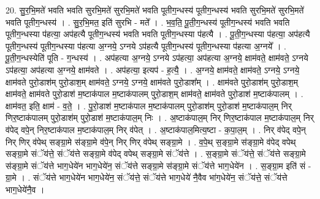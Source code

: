 \documentclass[17pt]{extarticle}
\begin{document}
20. सु॒र॒भि॒मते॑ भवति भवति सुरभि॒मते॑ सुरभि॒मते॑ भवति पूतीग॒न्धस्य॑ पूतीग॒न्धस्य॑ भवति सुरभि॒मते॑ सुरभि॒मते॑ भवति पूतीग॒न्धस्य॑ । . सु॒र॒भि॒मत॒ इति॑ सुरभि - मते᳚ । . भ॒व॒ति॒ पू॒ती॒ग॒न्धस्य॑ पूतीग॒न्धस्य॑ भवति भवति पूतीग॒न्धस्या प॑हत्या॒ अप॑हत्यै पूतीग॒न्धस्य॑ भवति भवति पूतीग॒न्धस्या प॑हत्यै । . पू॒ती॒ग॒न्धस्या प॑हत्या॒ अप॑हत्यै पूतीग॒न्धस्य॑ पूतीग॒न्धस्या प॑हत्या अ॒ग्नये॒ ऽग्नये ऽप॑हत्यै पूतीग॒न्धस्य॑ पूतीग॒न्धस्या प॑हत्या अ॒ग्नये᳚ । . पू॒ती॒ग॒न्धस्येति॑ पूति - ग॒न्धस्य॑ । . अप॑हत्या अ॒ग्नये॒ ऽग्नये ऽप॑हत्या॒ अप॑हत्या अ॒ग्नये॒ क्षाम॑वते॒ क्षाम॑वते॒ ऽग्नये ऽप॑हत्या॒ अप॑हत्या अ॒ग्नये॒ क्षाम॑वते । . अप॑हत्या॒ इत्यप॑ - ह॒त्यै॒ । . अ॒ग्नये॒ क्षाम॑वते॒ क्षाम॑वते॒ ऽग्नये॒ ऽग्नये॒ क्षाम॑वते पुरो॒डाश॑म् पुरो॒डाश॒म् क्षाम॑वते॒ ऽग्नये॒ ऽग्नये॒ क्षाम॑वते पुरो॒डाश᳚म् । . क्षाम॑वते पुरो॒डाश॑म् पुरो॒डाश॒म् क्षाम॑वते॒ क्षाम॑वते पुरो॒डाश॑ म॒ष्टाक॑पाल म॒ष्टाक॑पालम् पुरो॒डाश॒म् क्षाम॑वते॒ क्षाम॑वते पुरो॒डाश॑ म॒ष्टाक॑पालम् । . क्षाम॑वत॒ इति॒ क्षाम॑ - व॒ते॒ । . पु॒रो॒डाश॑ म॒ष्टाक॑पाल म॒ष्टाक॑पालम् पुरो॒डाश॑म् पुरो॒डाश॑ म॒ष्टाक॑पाल॒म् निर् णिर॒ष्टाक॑पालम् पुरो॒डाश॑म् पुरो॒डाश॑ म॒ष्टाक॑पाल॒म् निः । . अ॒ष्टाक॑पाल॒म् निर् णिर॒ष्टाक॑पाल म॒ष्टाक॑पाल॒म् निर् व॑पेद् वपे॒न् निर॒ष्टाक॑पाल म॒ष्टाक॑पाल॒म् निर् व॑पेत् । . अ॒ष्टाक॑पाल॒मित्य॒ष्टा - क॒पा॒ल॒म् । . निर् व॑पेद् वपे॒न् निर् णिर् व॑पेथ् सङ्ग्रा॒मे स॑ङ्ग्रा॒मे व॑पे॒न् निर् णिर् व॑पेथ् सङ्ग्रा॒मे । . व॒पे॒थ् स॒ङ्ग्रा॒मे स॑ङ्ग्रा॒मे व॑पेद् वपेथ् सङ्ग्रा॒मे संॅय॑त्ते॒ संॅय॑त्ते सङ्ग्रा॒मे व॑पेद् वपेथ् सङ्ग्रा॒मे संॅय॑त्ते । . स॒ङ्ग्रा॒मे संॅय॑त्ते॒ संॅय॑त्ते सङ्ग्रा॒मे स॑ङ्ग्रा॒मे संॅय॑त्ते भाग॒धेये॑न भाग॒धेये॑न॒ संॅय॑त्ते सङ्ग्रा॒मे स॑ङ्ग्रा॒मे संॅय॑त्ते भाग॒धेये॑न । . स॒ङ्ग्रा॒म इति॑ सं - ग्रा॒मे । . संॅय॑त्ते भाग॒धेये॑न भाग॒धेये॑न॒ संॅय॑त्ते॒ संॅय॑त्ते भाग॒धेये॑ नै॒वैव भा॑ग॒धेये॑न॒ संॅय॑त्ते॒ संॅय॑त्ते भाग॒धेये॑नै॒व । \newline
\end{document}
